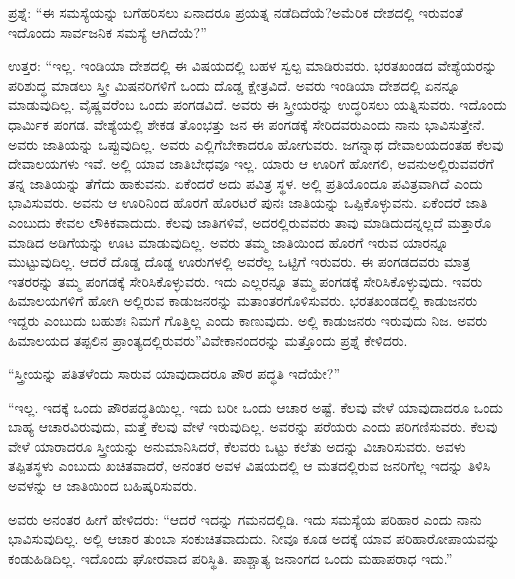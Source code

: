 ಪ್ರಶ್ನೆ: “ಈ ಸಮಸ್ಯೆಯನ್ನು ಬಗೆಹರಿಸಲು ಏನಾದರೂ ಪ್ರಯತ್ನ ನಡೆದಿದೆಯೆ?\break ಅಮೆರಿಕ ದೇಶದಲ್ಲಿ ಇರುವಂತೆ ಇದೊಂದು ಸಾರ್ವಜನಿಕ ಸಮಸ್ಯೆ ಆಗಿದೆಯೆ?”

ಉತ್ತರ: “ಇಲ್ಲ. ಇಂಡಿಯಾ ದೇಶದಲ್ಲಿ ಈ ವಿಷಯದಲ್ಲಿ ಬಹಳ ಸ್ವಲ್ಪ ಮಾಡಿರುವರು. ಭರತಖಂಡದ ವೇಶ್ಯೆಯರನ್ನು ಪರಿಶುದ್ಧ ಮಾಡಲು ಸ್ತ್ರೀ ಮಿಷನರಿಗಳಿಗೆ ಒಂದು ದೊಡ್ಡ ಕ್ಷೇತ್ರವಿದೆ. ಅವರು ಇಂಡಿಯಾ ದೇಶದಲ್ಲಿ ಏನನ್ನೂ ಮಾಡುವುದಿಲ್ಲ. ವೈಷ್ಣವರೆಂಬ ಒಂದು ಪಂಗಡವಿದೆ. ಅವರು ಈ ಸ್ತ್ರೀಯರನ್ನು ಉದ್ಧರಿಸಲು ಯತ್ನಿಸುವರು. ಇದೊಂದು ಧಾರ್ಮಿಕ ಪಂಗಡ. ವೇಶ್ಯೆಯಲ್ಲಿ ಶೇಕಡ ತೊಂಭತ್ತು ಜನ ಈ ಪಂಗಡಕ್ಕೆ ಸೇರಿದವರು\break ಎಂದು ನಾನು ಭಾವಿಸುತ್ತೇನೆ. ಅವರು ಜಾತಿಯನ್ನು ಒಪ್ಪುವುದಿಲ್ಲ. ಅವರು ಎಲ್ಲಿಗೆ\break ಬೇಕಾದರೂ ಹೋಗುವರು. ಜಗನ್ನಾಥ ದೇವಾಲಯದಂತಹ ಕೆಲವು ದೇವಾಲಯಗಳು ಇವೆ. ಅಲ್ಲಿ ಯಾವ ಜಾತಿಬೇಧವೂ ಇಲ್ಲ. ಯಾರು ಆ ಊರಿಗೆ ಹೋಗಲಿ, ಅವನು\break ಅಲ್ಲಿರುವವರೆಗೆ ತನ್ನ ಜಾತಿಯನ್ನು ತೆಗೆದು ಹಾಕುವನು. ಏಕೆಂದರೆ ಅದು ಪವಿತ್ರ ಸ್ಥಳ. ಅಲ್ಲಿ ಪ್ರತಿಯೊಂದೂ ಪವಿತ್ರವಾಗಿದೆ ಎಂದು ಭಾವಿಸುವರು. ಅವನು ಆ ಊರಿನಿಂದ ಹೊರಗೆ ಹೊರಟರೆ ಪುನಃ ಜಾತಿಯನ್ನು ಒಪ್ಪಿಕೊಳ್ಳುವನು. ಏಕೆಂದರೆ ಜಾತಿ ಎಂಬುದು ಕೇವಲ ಲೌಕಿಕವಾದುದು. ಕೆಲವು ಜಾತಿಗಳಿವೆ, ಅದರಲ್ಲಿರುವವರು ತಾವು ಮಾಡಿದುದನ್ನಲ್ಲದೆ ಮತ್ತಾರೊ ಮಾಡಿದ ಅಡಿಗೆಯನ್ನು ಊಟ ಮಾಡುವುದಿಲ್ಲ. ಅವರು ತಮ್ಮ ಜಾತಿಯಿಂದ ಹೊರಗೆ ಇರುವ ಯಾರನ್ನೂ ಮುಟ್ಟುವುದಿಲ್ಲ. ಆದರೆ ದೊಡ್ಡ ದೊಡ್ಡ ಊರುಗಳಲ್ಲಿ ಅವರೆಲ್ಲ ಒಟ್ಟಿಗೆ ಇರುವರು. ಈ ಪಂಗಡದವರು ಮಾತ್ರ ಇತರರನ್ನು ತಮ್ಮ ಪಂಗಡಕ್ಕೆ ಸೇರಿಸಿಕೊಳ್ಳುವರು. ಇದು ಎಲ್ಲರನ್ನೂ ತಮ್ಮ ಪಂಗಡಕ್ಕೆ ಸೇರಿಸಿಕೊಳ್ಳುವುದು. ಇವರು ಹಿಮಾಲಯಗಳಿಗೆ ಹೋಗಿ ಅಲ್ಲಿರುವ ಕಾಡುಜನರನ್ನು ಮತಾಂತರಗೊಳಿಸುವರು. ಭರತಖಂಡದಲ್ಲಿ ಕಾಡುಜನರು ಇದ್ದರು ಎಂಬುದು ಬಹುಶಃ ನಿಮಗೆ ಗೊತ್ತಿಲ್ಲ ಎಂದು ಕಾಣುವುದು. ಅಲ್ಲಿ ಕಾಡುಜನರು ಇರುವುದು ನಿಜ. ಅವರು ಹಿಮಾಲಯದ ತಪ್ಪಲಿನ ಪ್ರಾಂತ್ಯದಲ್ಲಿರುವರು”\break ವಿವೇಕಾನಂದರನ್ನು ಮತ್ತೊಂದು ಪ್ರಶ್ನೆ ಕೇಳಿದರು.

“ಸ್ತ್ರೀಯನ್ನು ಪತಿತಳೆಂದು ಸಾರುವ ಯಾವುದಾದರೂ ಪೌರ ಪದ್ಧತಿ ಇದೆಯೇ?”

“ಇಲ್ಲ. ಇದಕ್ಕೆ ಒಂದು ಪೌರಪದ್ಧತಿಯಿಲ್ಲ. ಇದು ಬರೀ ಒಂದು ಆಚಾರ ಅಷ್ಟೆ. ಕೆಲವು ವೇಳೆ ಯಾವುದಾದರೂ ಒಂದು ಬಾಹ್ಯ ಆಚಾರವಿರುವುದು, ಮತ್ತೆ ಕೆಲವು ವೇಳೆ ಇರುವುದಿಲ್ಲ. ಅವರನ್ನು ಪರೆಯರು ಎಂದು ಪರಿಗಣಿಸುವರು. ಕೆಲವು ವೇಳೆ ಯಾರಾದರೂ ಸ್ತ್ರೀಯನ್ನು ಅನುಮಾನಿಸಿದರೆ, ಕೆಲವರು ಒಟ್ಟು ಕಲೆತು ಅದನ್ನು ವಿಚಾರಿಸುವರು. ಅವಳು ತಪ್ಪಿತಸ್ಥಳು ಎಂಬುದು ಖಚಿತವಾದರೆ, ಅನಂತರ ಅವಳ ವಿಷಯದಲ್ಲಿ ಆ ಮತದಲ್ಲಿರುವ ಜನರಿಗೆಲ್ಲ ಇದನ್ನು ತಿಳಿಸಿ ಅವಳನ್ನು ಆ ಜಾತಿಯಿಂದ ಬಹಿಷ್ಕರಿಸುವರು.

ಅವರು ಅನಂತರ ಹೀಗೆ ಹೇಳಿದರು: “ಆದರೆ ಇದನ್ನು ಗಮನದಲ್ಲಿಡಿ. ಇದು ಸಮಸ್ಯೆಯ ಪರಿಹಾರ ಎಂದು ನಾನು ಭಾವಿಸುವುದಿಲ್ಲ. ಅಲ್ಲಿ ಆಚಾರ ತುಂಬಾ ಸಂಕುಚಿತವಾದುದು. ನೀವೂ ಕೂಡ ಅದಕ್ಕೆ ಯಾವ ಪರಿಹಾರೋಪಾಯವನ್ನು ಕಂಡುಹಿಡಿದಿಲ್ಲ. ಇದೊಂದು ಘೋರವಾದ ಪರಿಸ್ಥಿತಿ. ಪಾಶ್ಚಾತ್ಯ ಜನಾಂಗದ ಒಂದು ಮಹಾಪರಾಧ ಇದು.”

